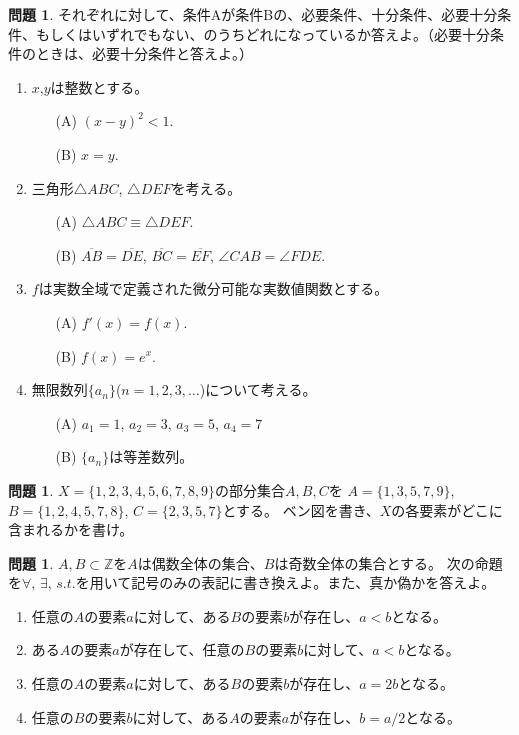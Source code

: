 \documentclass[uplatex]{jsarticle}
\theoremstyle{definition}
\numberwithin{equation}{section}
\newtheorem{prob}[section]{問題}
\newcommand{\Z}{\mathbb{Z}}
\begin{document}
\begin{prob}
  それぞれに対して、条件Aが条件Bの、必要条件、十分条件、必要十分条件、もしくはいずれでもない、のうちどれになっているか答えよ。（必要十分条件のときは、必要十分条件と答えよ。）
  \begin{enumerate}
    \item $x$,$y$は整数とする。
      \begin{enumerate}
        \item[(A)] $(x-y)^2 < 1$.
        \item[(B)] $x=y$.
      \end{enumerate}
    \item 三角形$\triangle{ABC}$, $\triangle{DEF}$を考える。
      \begin{enumerate}
        \item[(A)] $\triangle{ABC}\equiv \triangle{DEF}$.
        \item[(B)] $\overline{AB}=\overline{DE}$, $\overline{BC}=\overline{EF}$, $\angle CAB = \angle FDE$.
      \end{enumerate}
    \item
      $f$は実数全域で定義された微分可能な実数値関数とする。
      \begin{enumerate}
        \item[(A)] $f'(x)=f(x)$.
        \item[(B)] $f(x)=e^x$.
      \end{enumerate}
    \item 無限数列$\{a_n\}$($n=1,2,3,\dots$)について考える。
      \begin{enumerate}
        \item[(A)] $a_1 = 1$, $a_2=3$, $a_3=5$, $a_4= 7$
        \item[(B)] $\{a_n\}$は等差数列。
      \end{enumerate}
  \end{enumerate}
\end{prob}

\begin{prob}
  $X=\{1,2,3,4,5,6,7,8,9\}$の部分集合$A,B,C$を
  $A=\{1,3,5,7,9\}$, $B=\{1,2,4,5,7,8\}$, $C=\{2,3,5,7\}$とする。
  ベン図を書き、$X$の各要素がどこに含まれるかを書け。
\end{prob}

\begin{prob}
  $A, B \subset \Z$を$A$は偶数全体の集合、$B$は奇数全体の集合とする。
  次の命題を$\forall$, $\exists$, $s.t.$を用いて記号のみの表記に書き換えよ。また、真か偽かを答えよ。
  \begin{enumerate}
    \item 任意の$A$の要素$a$に対して、ある$B$の要素$b$が存在し、$a<b$となる。
    \item ある$A$の要素$a$が存在して、任意の$B$の要素$b$に対して、$a<b$となる。
    \item 任意の$A$の要素$a$に対して、ある$B$の要素$b$が存在し、$a=2b$となる。
    \item 任意の$B$の要素$b$に対して、ある$A$の要素$a$が存在し、$b=a/2$となる。
  \end{enumerate}

\end{prob}
\end{document}
